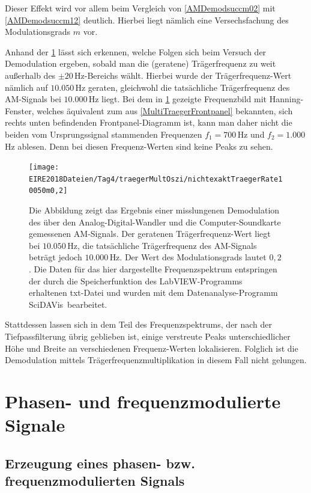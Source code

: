 \documentclass[
a4paper,
12pt,
pagesize,
ngerman
]{scrartcl}
\begin{document}
	\noindent Dieser Effekt wird vor allem beim Vergleich von \cref{AMDemodsuccm02} mit \cref{AMDemodsuccm12} deutlich. 
	Hierbei liegt nämlich eine Versechsfachung des Modulationsgrads $m$ vor. 
	
	Anhand der \cref{AMDemodfailm02} lässt sich erkennen, welche Folgen sich beim Versuch der Demodulation ergeben, sobald man die (geratene) Trägerfrequenz zu weit außerhalb des $\pm 20\,$Hz-Bereichs wählt.
	Hierbei wurde der Trägerfrequenz-Wert nämlich auf $10.050\,$Hz geraten, gleichwohl die tatsächliche Trägerfrequenz des AM-Signals bei $10.000\,$Hz liegt. 
	Bei dem in \cref{AMDemodfailm02} gezeigte Frequenzbild mit Hanning-Fenster, welches äquivalent zum aus \cref{MultiTraegerFrontpanel} bekannten, sich rechts unten befindenden Frontpanel-Diagramm ist, kann man daher nicht die beiden vom Ursprungssignal stammenden Frequenzen $f_1 = 700\,$Hz und $f_2 = 1.000\,$Hz ablesen.
	Denn bei diesen Frequenz-Werten sind keine Peaks zu sehen.
	
	\begin{figure}[H]
		\centering
		\texttt{[image: EIRE2018Dateien/Tag4/traegerMultOszi/nichtexaktTraegerRate10050m0,2]}
		\caption{Die Abbildung zeigt das Ergebnis einer misslungenen Demodulation des über den Analog-Digital-Wandler und die Computer-Soundkarte gemessenen AM-Signals. Der geratenen Trägerfrequenz-Wert liegt bei $10.050\,$Hz, die tatsächliche Trägerfrequenz des AM-Signals beträgt jedoch $10.000\,$Hz. Der Wert des Modulationsgrads lautet $0,2$. Die Daten für das hier dargestellte Frequenzspektrum entspringen der durch die Speicherfunktion des LabVIEW-Programms erhaltenen txt-Datei und wurden mit dem Datenanalyse-Programm \glqq SciDAVis\grqq\ bearbeitet.}
		\label{AMDemodfailm02}
	\end{figure}

	\noindent Stattdessen lassen sich in dem Teil des Frequenzspektrums, der nach der Tiefpassfilterung übrig geblieben ist, einige verstreute Peaks unterschiedlicher Höhe und Breite an verschiedenen Frequenz-Werten lokalisieren.
	Folglich ist die Demodulation mittels Trägerfrequenzmultiplikation in diesem Fall nicht gelungen.
	
	
	\section{Phasen- und frequenzmodulierte Signale}
	
	\subsection{Erzeugung eines phasen- bzw. frequenzmodulierten Signals} \label{FMPMErzeugung}
		
\end{document}
